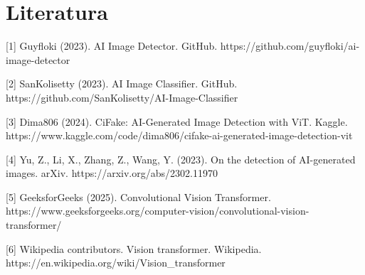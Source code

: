 \documentclass[conference]{IEEEtran}
\def\ConvColor{rgb:yellow,5;red,2.5;white,5}
\def\PoolColor{rgb:red,1;black,0.3}
\begin{document}



\section*{Literatura}

[1] Guyfloki (2023). AI Image Detector. GitHub.
https://github.com/guyfloki/ai-image-detector

[2] SanKolisetty (2023). AI Image Classifier. GitHub.
https://github.com/SanKolisetty/AI-Image-Classifier

[3] Dima806 (2024). CiFake: AI-Generated Image Detection with ViT. Kaggle.
https://www.kaggle.com/code/dima806/cifake-ai-generated-image-detection-vit

[4] Yu, Z., Li, X., Zhang, Z., Wang, Y. (2023). On the detection of AI-generated images. arXiv.
https://arxiv.org/abs/2302.11970

[5] GeeksforGeeks (2025). Convolutional Vision Transformer.
https://www.geeksforgeeks.org/computer-vision/convolutional-vision-transformer/

[6] Wikipedia contributors. Vision transformer. Wikipedia.
https://en.wikipedia.org/wiki/Vision\_transformer
\end{document}
